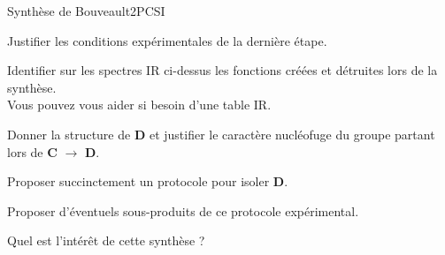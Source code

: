 \begin{exercise}{Synthèse de Bouveault}{2}{PCSI}
\begin{questions}
\question Justifier les conditions expérimentales de la dernière étape.

\question Identifier sur les spectres IR ci-dessus les fonctions créées et détruites lors de la synthèse. \\
Vous pouvez vous aider si besoin d'une table IR.

\question Donner la structure de \textbf{D} et justifier le caractère nucléofuge du groupe partant lors de \textbf{C} $\longrightarrow$ \textbf{D}.

\question Proposer succinctement un protocole pour isoler \textbf{D}.

\question Proposer d'éventuels sous-produits de ce protocole expérimental.

\question Quel est l'intérêt de cette synthèse ?


\end{questions}
\end{exercise}

